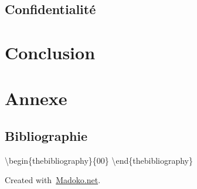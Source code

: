 \documentclass[11pt]{book}
\begin{document}
\subsection{Confidentialité}\label{sec-confidentialit}%

\section{Conclusion}\label{sec-conclusion}%

\section{Annexe}\label{sec-annexe}%

\subsection{Bibliographie}\label{sec-bibliographie}%

\noindent{}\textbackslash{}begin\{thebibliography\}\{00\}
\textbackslash{}end\{thebibliography\}%

\begin{mdbmargintb}{4em}{}%
\begin{mdflushright}%
{\tiny{}Created with~\href{https://www.madoko.net}{Madoko.net}.}%
\end{mdflushright}%
\end{mdbmargintb}%
\end{document}
